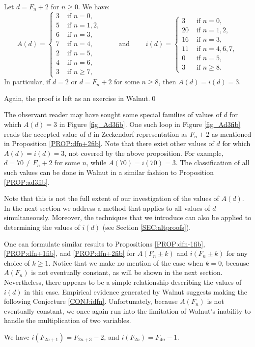 \documentclass[10pt,a4paper,reqno]{amsart}
\newcommand{\walnut}{{\ttfamily Walnut}}
\begin{document}
\begin{prop}\label{PROP:dfn+2fib}
Let $d=F_n+2$ for $n\geq 0$. We have:
\[
A(d) =
\begin{cases}
3 &\text{ if } n=0,\\
5 &\text{ if } n=1,2,\\
6 &\text{ if } n=3,\\
7 &\text{ if } n=4,\\
2 &\text{ if } n=5,\\
4 &\text{ if } n=6,\\
3 &\text{ if } n\geq7,
\end{cases}
\qquad \text{ and } \qquad
i(d) =
\begin{cases}
3  &\text{ if } n=0,\\
20 &\text{ if } n=1,2,\\
16 &\text{ if } n=3,\\
11 &\text{ if } n=4,6,7,\\
0  &\text{ if } n=5,\\
3  &\text{ if } n\geq8.
\end{cases}
\]
In particular, if $d=2$ or $d=F_n+2$ for some $n\geq8$, then $A(d)=i(d)=3$.
\end{prop}
Again, the proof is left as an exercise in \walnut{}.\hfill\qed
\begin{rem}
    The observant reader may have sought some special families of values of $d$ for which $A(d)=3$ in Figure \ref{fig_Ad3fib}. One such loop in Figure \ref{fig_Ad3fib} reads the accepted value of $d$ in Zeckendorf representation as $F_n+2$ as mentioned in Proposition \ref{PROP:dfn+2fib}. Note that there exist other values of $d$ for which $A(d)=i(d)=3$, not covered by the above proposition. For example, $d=70\neq F_n+2$ for some $n$, while $A(70)=i(70)=3$. The classification of all such values can be done in \walnut{} in a similar fashion to Proposition \ref{PROP:ad3fib}.
\end{rem}
Note that this is not the full extent of our investigation of the values of $A(d)$. In the next section we address a method that applies to all values of $d$ simultaneously. Moreover, the techniques that we introduce can also be applied to determining the values of $i(d)$ (see Section \ref{SEC:altproofs}).

One can formulate similar results to Propositions \ref{PROP:dfn-1fib}, \ref{PROP:dfn+1fib}, and \ref{PROP:dfn+2fib} for $A(F_n\pm k)$ and $i(F_n\pm k)$ for any choice of $k\geq 1$. Notice that we make no mention of the case when $k=0$, because $A(F_n)$ is not eventually constant, as will be shown in the next section. Nevertheless, there appears to be a simple relationship describing the values of $i(d)$ in this case. Empirical evidence generated by \walnut{} suggests making the following Conjecture \ref{CONJ:idfn}. Unfortunately, because $A(F_n)$ is not eventually constant, we once again run into the limitation of \walnut{}'s inability to handle the multiplication of two variables.
\begin{conj}\label{CONJ:idfn}
    We have $i(F_{2n+1}) = F_{2n+3} - 2$, and $i(F_{2n})=F_{4n}-1$.
\end{conj}
\end{document}
